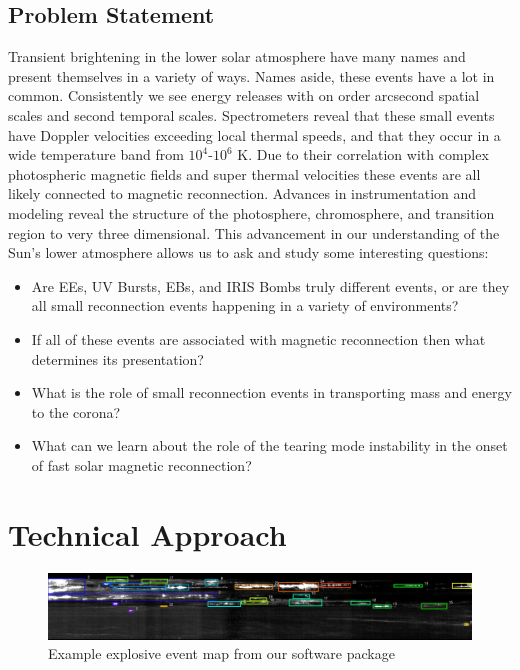 \documentclass[]{aastex6}
\begin{document}
	
	
	\subsection{Problem Statement} 
	Transient brightening in the lower solar atmosphere have many names and present themselves in a variety of ways. Names aside, these events have a lot in common.  Consistently we see energy releases with on order arcsecond spatial scales and second temporal scales. Spectrometers reveal that these small events have Doppler velocities exceeding local thermal speeds, and that they occur in a wide temperature band from $10^4$-$10^6$ K.  Due to their correlation with complex photospheric magnetic fields and super thermal velocities these events are all likely connected to magnetic reconnection. Advances in instrumentation and modeling reveal the structure of the photosphere, chromosphere, and transition region to very three dimensional.  This advancement in our understanding of the Sun's lower atmosphere allows us to ask and study some interesting questions:
	
		\begin{itemize}
	
			\item Are EEs, UV Bursts, EBs, and IRIS Bombs truly different events, or are they all small reconnection events happening in a variety of environments?
			\item If all of these events are associated with magnetic reconnection then what determines its presentation?
			\item What is the role of small reconnection events in transporting mass and energy to the corona?
			\item What can we learn about the role of the tearing mode instability in the onset of fast solar magnetic reconnection?
			
			
		\end{itemize}
	
	

\section{Technical Approach} 


\begin{figure}
	\label{fig:eemap}
	\caption{Example explosive event map from our software package}
	\centerline{\includegraphics[scale=.5]{./NESSF_img/ee_map.eps}}
	
\end{figure}
\end{document}
